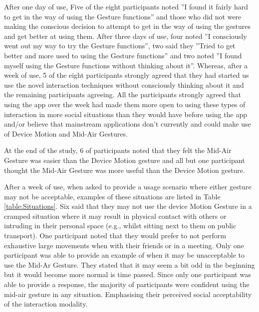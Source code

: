 \documentclass{l4proj}
\begin{document}
After one day of use, Five of the eight participants noted ''I found it fairly hard to get in the way of using the Gesture functions'' and those who did not were making the conscious decision to attempt to get in the way of using the gestures and get better at using them. After three days of use, four noted ''I consciously went out my way to try the Gesture functions'', two said they ''Tried to get better and more used to using the Gesture functions'' and two noted ''I found myself using the Gesture functions without thinking about it''. Whereas, after a week of use, 5 of the eight participants strongly agreed that they had started us use the novel interaction techniques without consciously thinking about it and the remaining participants agreeing. All the participants strongly agreed that using the app over the week had made them more open to using these types of interaction in more social situations than they would have before using the app and/or believe that mainstream applications don't currently and could make use of Device Motion and Mid-Air Gestures.

At the end of the study, 6 of participants noted that they felt the Mid-Air Gesture was easier than the Device Motion gesture and all but one participant thought the Mid-Air Gesture was more useful than the Device Motion gesture.

After a week of use, when asked to provide a usage scenario where either gesture may not be acceptable, examples of these situations are listed in Table \ref{table:Situations}. Six said that they may not use the device Motion Gesture in a cramped situation where it may result in physical contact with others or intruding in their personal space (e.g., whilst sitting next to them on public transport). One participant noted that they would prefer to not perform exhaustive large movements when with their friends or in a meeting. Only one participant was able to provide an example of when it may be unacceptable to use the Mid-Ar Gesture. They stated that it may seem a bit odd in the beginning but it would become more normal is time passed. Since only one participant was able to provide a response, the majority of participants were confident using the mid-air gesture in any situation. Emphasising their perceived social acceptability of the interaction modality.
\end{document}
